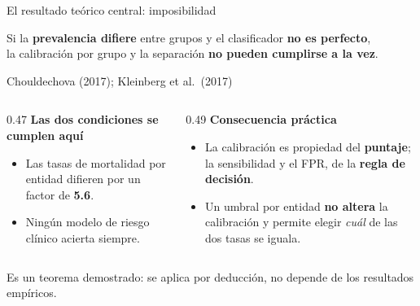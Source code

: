 \documentclass[aspectratio=169,11pt]{beamer}
\newcommand{\resalta}[1]{{\color{vino}\bfseries #1}}
\newcommand{\cifra}[1]{{\color{naranja}\bfseries #1}}
\begin{document}
\begin{frame}{El resultado teórico central: imposibilidad}
  \vspace{0.6em}
  \begin{center}
  \begin{minipage}{0.90\textwidth}
    \begin{block}{}
      \centering
      Si la \resalta{prevalencia difiere} entre grupos y el clasificador
      \resalta{no es perfecto},\\ la calibración por grupo y la separación
      \resalta{no pueden cumplirse a la vez}.
      \vspace{0.3em}

      {\footnotesize Chouldechova (2017); Kleinberg et al.\ (2017)}
    \end{block}
  \end{minipage}
  \end{center}

  \vspace{0.9em}
  \begin{columns}[T,onlytextwidth]
    \begin{column}{0.47\textwidth}
      {\bfseries Las dos condiciones se cumplen aquí}
      \begin{itemize}\small
        \item Las tasas de mortalidad por entidad difieren por un factor de
              \cifra{5.6}.
        \item Ningún modelo de riesgo clínico acierta siempre.
      \end{itemize}
    \end{column}
    \begin{column}{0.49\textwidth}
      {\bfseries Consecuencia práctica}
      \begin{itemize}\small
        \item La calibración es propiedad del \resalta{puntaje}; la sensibilidad
              y el FPR, de la \resalta{regla de decisión}.
        \item Un umbral por entidad \resalta{no altera} la calibración y permite
              elegir \textit{cuál} de las dos tasas se iguala.
      \end{itemize}
    \end{column}
  \end{columns}

  \vspace{0.7em}
  {\footnotesize\color{humo} Es un teorema demostrado: se aplica por deducción,
  no depende de los resultados empíricos.}
\end{frame}
\end{document}
